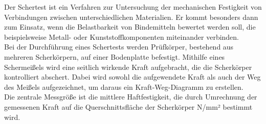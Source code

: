 Der Schertest ist ein Verfahren zur Untersuchung der mechanischen Festigkeit von Verbindungen zwischen unterschiedlichen Materialien.  Er kommt besonders dann zum Einsatz, wenn die Belastbarkeit von Bindemitteln bewertet werden soll, die beispielsweise Metall- oder Kunststoffkomponenten miteinander verbinden.\\

Bei der Durchführung eines Schertests werden Prüfkörper, bestehend aus mehreren Scherkörpern, auf einer Bodenplatte befestigt. Mithilfe eines Schermeißels wird eine seitlich wirkende Kraft aufgebracht, die die Scherkörper kontrolliert abschert. Dabei wird sowohl die aufgewendete Kraft als auch der Weg des Meißels aufgezeichnet, um daraus ein Kraft-Weg-Diagramm zu erstellen.\\

Die zentrale Messgröße ist die mittlere Haftfestigkeit, die durch Umrechnung der gemessenen Kraft auf die Querschnittsfläche der Scherkörper N/mm² bestimmt wird.  \\

